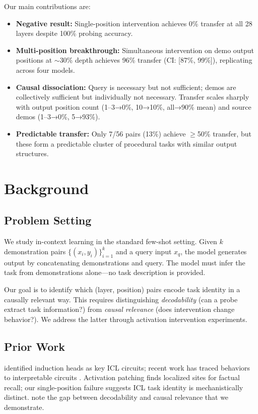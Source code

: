 \documentclass[11pt]{article}
\begin{document}
Our main contributions are:
\begin{itemize}
    \item \textbf{Negative result:} Single-position intervention achieves 0\% transfer at all 28 layers despite 100\% probing accuracy.
    \item \textbf{Multi-position breakthrough:} Simultaneous intervention on demo output positions at $\sim$30\% depth achieves 96\% transfer (CI: [87\%, 99\%]), replicating across four models.
    \item \textbf{Causal dissociation:} Query is necessary but not sufficient; demos are collectively sufficient but individually not necessary. Transfer scales sharply with output position count (1--3→0\%, 10→10\%, all→90\% mean) and source demos (1--3→0\%, 5→93\%).
    \item \textbf{Predictable transfer:} Only 7/56 pairs (13\%) achieve $\geq$50\% transfer, but these form a predictable cluster of procedural tasks with similar output structures.
\end{itemize}

\section{Background}
\label{sec:background}

\subsection{Problem Setting}

We study in-context learning in the standard few-shot setting. Given $k$ demonstration pairs $\{(x_i, y_i)\}_{i=1}^k$ and a query input $x_q$, the model generates output by concatenating demonstrations and query. The model must infer the task from demonstrations alone---no task description is provided.

Our goal is to identify which (layer, position) pairs encode task identity in a causally relevant way. This requires distinguishing \emph{decodability} (can a probe extract task information?) from \emph{causal relevance} (does intervention change behavior?). We address the latter through activation intervention experiments.

\subsection{Prior Work}

\citet{olsson2022context} identified induction heads as key ICL circuits; recent work has traced behaviors to interpretable circuits \citep{wang2023interpretability,conmy2023towards}. Activation patching \citep{vig2020investigating,meng2022locating} finds localized sites for factual recall; our single-position failure suggests ICL task identity is mechanistically distinct. \citet{belinkov2019analysis} note the gap between decodability and causal relevance that we demonstrate.
\end{document}

